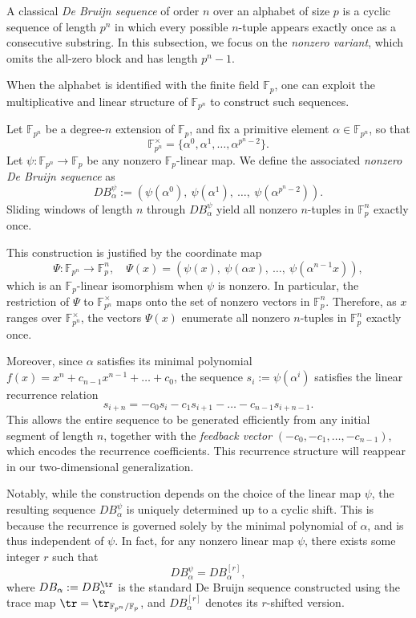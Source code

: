 \documentclass{article}
\begin{document}
A classical \emph{De Bruijn sequence} of order \( n \) over an alphabet of size \( p \) is a cyclic sequence of length \( p^n \) in which every possible \( n \)-tuple appears exactly once as a consecutive substring. In this subsection, we focus on the \emph{nonzero variant}, which omits the all-zero block and has length \( p^n - 1 \).

When the alphabet is identified with the finite field \( \mathbb{F}_p \), one can exploit the multiplicative and linear structure of \( \mathbb{F}_{p^n} \) to construct such sequences.

Let \( \mathbb{F}_{p^n} \) be a degree-\( n \) extension of \( \mathbb{F}_p \), and fix a primitive element \( \alpha \in \mathbb{F}_{p^n} \), so that
\[
\mathbb{F}_{p^n}^\times = \{ \alpha^0, \alpha^1, \dots, \alpha^{p^n - 2} \}.
\]
Let \( \psi: \mathbb{F}_{p^n} \to \mathbb{F}_p \) be any nonzero \( \mathbb{F}_p \)-linear map. We define the associated \emph{nonzero De Bruijn sequence} as
\[
DB^\psi_\alpha := \left( \psi(\alpha^0),\ \psi(\alpha^1),\ \dots,\ \psi(\alpha^{p^n - 2}) \right).
\]
Sliding windows of length \( n \) through \( DB^\psi_\alpha \) yield all nonzero \( n \)-tuples in \( \mathbb{F}_p^n \) exactly once.


This construction is justified by the coordinate map
\[
\Psi: \mathbb{F}_{p^n} \to \mathbb{F}_p^n, \quad
\Psi(x) = \left( \psi(x),\ \psi(\alpha x),\ \dots,\ \psi(\alpha^{n-1} x) \right),
\]
which is an \( \mathbb{F}_p \)-linear isomorphism when \( \psi \) is nonzero. In particular, the restriction of \( \Psi \) to \( \mathbb{F}_{p^n}^\times \) maps onto the set of nonzero vectors in \( \mathbb{F}_p^n \). Therefore, as \( x \) ranges over \( \mathbb{F}_{p^n}^\times \), the vectors \( \Psi(x) \) enumerate all nonzero \( n \)-tuples in \( \mathbb{F}_p^n \) exactly once.


Moreover, since \( \alpha \) satisfies its minimal polynomial \( f(x) = x^n + c_{n-1} x^{n-1} + \dots + c_0 \), the sequence \( s_i := \psi(\alpha^i) \) satisfies the linear recurrence relation
\[
s_{i+n} = -c_0 s_i - c_1 s_{i+1} - \dots - c_{n-1} s_{i+n-1}.
\]
This allows the entire sequence to be generated efficiently from any initial segment of length \( n \), together with the \emph{feedback vector} \( (-c_0, -c_1, \dots, -c_{n-1}) \), which encodes the recurrence coefficients. This recurrence structure will reappear in our two-dimensional generalization.



Notably, while the construction depends on the choice of the linear map \( \psi \), the resulting sequence \( DB^\psi_\alpha \) is uniquely determined up to a cyclic shift. This is because the recurrence is governed solely by the minimal polynomial of \( \alpha \), and is thus independent of \( \psi \). In fact, for any nonzero linear map \( \psi \), there exists some integer \( r \) such that
\[
DB^\psi_\alpha = DB_\alpha^{[r]},
\]
where \( DB_\alpha := DB^{\tr}_\alpha \) is the standard De Bruijn sequence constructed using the trace map \( \tr = \tr_{\mathbb{F}_{p^n}/\mathbb{F}_p} \), and \( DB_\alpha^{[r]} \) denotes its \( r \)-shifted version.
\end{document}
